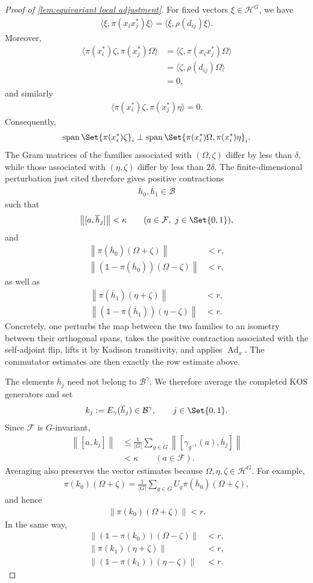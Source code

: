 \documentclass[a4paper,10pt]{article}
\numberwithin{equation}{section}
\theoremstyle{plain}
\theoremstyle{plain}
\theoremstyle{plain}
\theoremstyle{plain}
\theoremstyle{plain}
\theoremstyle{remark}
\theoremstyle{definition}
\newcommand{\calB}{\mathcal{B}}
\newcommand{\calF}{\mathcal{F}}
\newcommand{\calH}{\mathcal{H}}
\newcommand\norm[1]{\left\lVert#1\right\rVert}
\newcommand{\ip}[2]{\langle #1, #2 \rangle}
\newcommand{\Id}{\mathds{1}}
\newcommand{\eq}[1]{\begin{align*}#1\end{align*}}
\newcommand{\br}[1]{\left(#1\right)}
\begin{document}
\begin{proof}[Proof of \cref{lem:equivariant local adjustment}]
For fixed vectors \(\xi\in\calH^G\), we have
\eq{
    \ip{\xi}{\pi(x_ix_j^*)\xi}
    =
    \ip{\xi}{\rho(d_{ij})\xi}.
}
Moreover,
\eq{
    \ip{\pi(x_i^*)\zeta}
       {\pi(x_j^*)\Omega}
    &=
    \ip{\zeta}{\pi(x_ix_j^*)\Omega}\\
    &=
    \ip{\zeta}{\rho(d_{ij})\Omega}\\
    &=
    0,
}
and similarly
\eq{
    \ip{\pi(x_i^*)\zeta}
       {\pi(x_j^*)\eta}
    =
    0.
}
Consequently,
\eq{
    \operatorname{span}
    \Set{
        \pi(x_i^*)\zeta
    }_i
    \perp
    \operatorname{span}
    \Set{
        \pi(x_i^*)\Omega,
        \pi(x_i^*)\eta
    }_i.
}
The Gram matrices of the families associated with
\((\Omega,\zeta)\) differ by less than \(\delta\), while those
associated with \((\eta,\zeta)\) differ by less than \(2\delta\).
The finite-dimensional perturbation just cited therefore gives
positive contractions
\eq{
    \overline h_0,\overline h_1
    \in
    \calB
}
such that
\eq{
    \norm{
        [a,\overline h_j]
    }
    <
    \kappa
    \qquad
    (a\in\calF,\ j\in\Set{0,1}),
}
and
\eq{
    \norm{
        \pi(\overline h_0)(\Omega+\zeta)
    }
    &<
    r,\\
    \norm{
        \br{
            \Id-\pi(\overline h_0)
        }
        (\Omega-\zeta)
    }
    &<
    r,
}
as well as
\eq{
    \norm{
        \pi(\overline h_1)(\eta+\zeta)
    }
    &<
    r,\\
    \norm{
        \br{
            \Id-\pi(\overline h_1)
        }
        (\eta-\zeta)
    }
    &<
    r.
}
Concretely, one perturbs the map between the two families to an
isometry between their orthogonal spans, takes the positive
contraction associated with the self-adjoint flip, lifts it by
Kadison transitivity, and applies \(\operatorname{Ad}_x\). The
commutator estimates are then exactly the row estimate above.

The elements \(\overline h_j\) need not belong to
\(\calB^\gamma\). We therefore average the completed KOS generators
and set
\eq{
    k_j
    :=
    E_\gamma(\overline h_j)
    \in
    \calB^\gamma,
    \qquad
    j\in\Set{0,1}.
}
Since \(\calF\) is \(G\)-invariant,
\eq{
    \norm{
        [a,k_j]
    }
    &\leq
    \frac{1}{|G|}
    \sum_{g\in G}
    \norm{
        [
            \gamma_{g^{-1}}(a),
            \overline h_j
        ]
    }\\
    &<
    \kappa
    \qquad
    (a\in\calF).
}
Averaging also preserves the vector estimates because
\(\Omega,\eta,\zeta\in\calH^G\). For example,
\eq{
    \pi(k_0)(\Omega+\zeta)
    =
    \frac{1}{|G|}
    \sum_{g\in G}
    U_g\pi(\overline h_0)(\Omega+\zeta),
}
and hence
\eq{
    \norm{
        \pi(k_0)(\Omega+\zeta)
    }
    <
    r.
}
In the same way,
\eq{
    \norm{
        \br{
            \Id-\pi(k_0)
        }
        (\Omega-\zeta)
    }
    &<
    r,\\
    \norm{
        \pi(k_1)(\eta+\zeta)
    }
    &<
    r,\\
    \norm{
        \br{
            \Id-\pi(k_1)
        }
        (\eta-\zeta)
    }
    &<
    r.
}


\end{proof}
\end{document}
